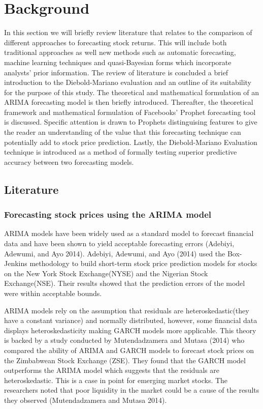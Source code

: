 \documentclass[12pt,a4paper]{article}
\numberwithin{equation}{section}
\numberwithin{figure}{section}
\numberwithin{table}{section}
\begin{document}
\section{Background}\label{background}

In this section we will briefly review literature that relates to the
comparison of different approaches to forecasting stock returns. This
will include both traditional approaches as well new methods such as
automatic forecasting, machine learning techniques and quasi-Bayesian
forms which incorporate analysts' prior information. The review of
literature is concluded a brief introduction to the Diebold-Mariano
evaluation and an outline of its suitability for the purpose of this
study. The theoretical and mathematical formulation of an ARIMA
forecasting model is then briefly introduced. Thereafter, the
theoretical framework and mathematical formulation of Facebooks' Prophet
forecasting tool is discussed. Specific attention is drawn to Prophets
distinguising features to give the reader an understanding of the value
that this forecasting technique can potentially add to stock price
prediction. Lastly, the Diebold-Mariano Evaluation technique is
introduced as a method of formally testing superior predictive accuracy
between two forecasting models.

\subsection{Literature}\label{literature}

\subsubsection{Forecasting stock prices using the ARIMA
model}\label{forecasting-stock-prices-using-the-arima-model}

ARIMA models have been widely used as a standard model to forecast
financial data and have been shown to yield acceptable forecasting
errors (Adebiyi, Adewumi, and Ayo 2014). Adebiyi, Adewumi, and Ayo
(2014) used the Box-Jenkins methodology to build short-term stock price
prediction models for stocks on the New York Stock Exchange(NYSE) and
the Nigerian Stock Exchange(NSE). Their results showed that the
prediction errors of the model were within acceptable bounds.

ARIMA models rely on the assumption that residuals are
heteroskedastic(they have a constant variance) and normally distributed,
however, some financial data displays heteroskedasticity making GARCH
models more applicable. This theory is backed by a study conducted by
Mutendadzamera and Mutasa (2014) who compared the ability of ARIMA and
GARCH models to forecast stock prices on the Zimbabwean Stock Exchange
(ZSE). They found that the GARCH model outperforms the ARIMA model which
suggests that the residuals are heteroskedastic. This is a case in point
for emerging market stocks. The researchers noted that poor liquidity in
the market could be a cause of the results they observed (Mutendadzamera
and Mutasa 2014).
\end{document}
